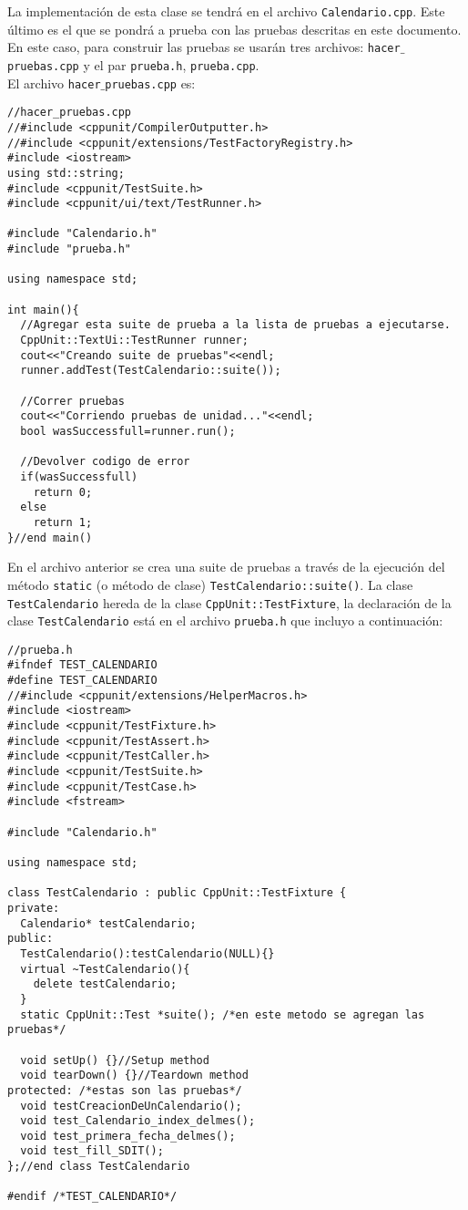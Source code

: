 \documentclass{article}
\begin{document}
La implementaci\'on de esta clase se tendr\'a en el archivo 
{\tt Calendario.cpp}. Este \'ultimo es el que se pondr\'a a 
prueba con las pruebas descritas en este documento. En este caso, 
para construir las pruebas se usar\'an tres archivos: 
{\tt hacer$\_$pruebas.cpp} y el par {\tt prueba.h}, {\tt prueba.cpp}.\\
El archivo {\tt hacer$\_$pruebas.cpp} es:
\begin{verbatim}
//hacer_pruebas.cpp
//#include <cppunit/CompilerOutputter.h>
//#include <cppunit/extensions/TestFactoryRegistry.h>
#include <iostream>
using std::string;
#include <cppunit/TestSuite.h>
#include <cppunit/ui/text/TestRunner.h>

#include "Calendario.h"
#include "prueba.h"

using namespace std;

int main(){
  //Agregar esta suite de prueba a la lista de pruebas a ejecutarse.
  CppUnit::TextUi::TestRunner runner;
  cout<<"Creando suite de pruebas"<<endl;
  runner.addTest(TestCalendario::suite());

  //Correr pruebas
  cout<<"Corriendo pruebas de unidad..."<<endl;
  bool wasSuccessfull=runner.run();

  //Devolver codigo de error
  if(wasSuccessfull)
    return 0;
  else
    return 1;
}//end main()
\end{verbatim}
En el archivo anterior se crea una suite de pruebas a trav\'es 
de la ejecuci\'on del m\'etodo {\tt static} (o m\'etodo de clase) 
{\tt TestCalendario::suite()}. La clase {\tt TestCalendario} 
hereda de la clase {\tt CppUnit::TestFixture}, la declaraci\'on 
de la clase {\tt TestCalendario} est\'a en el archivo 
{\tt prueba.h} que incluyo a continuaci\'on:
\begin{verbatim}
//prueba.h
#ifndef TEST_CALENDARIO
#define TEST_CALENDARIO
//#include <cppunit/extensions/HelperMacros.h>
#include <iostream>
#include <cppunit/TestFixture.h>
#include <cppunit/TestAssert.h>
#include <cppunit/TestCaller.h>
#include <cppunit/TestSuite.h>
#include <cppunit/TestCase.h>
#include <fstream>

#include "Calendario.h"

using namespace std;

class TestCalendario : public CppUnit::TestFixture {
private:
  Calendario* testCalendario;
public:
  TestCalendario():testCalendario(NULL){}
  virtual ~TestCalendario(){
    delete testCalendario;
  }
  static CppUnit::Test *suite(); /*en este metodo se agregan las pruebas*/
   
  void setUp() {}//Setup method
  void tearDown() {}//Teardown method
protected: /*estas son las pruebas*/
  void testCreacionDeUnCalendario();
  void test_Calendario_index_delmes();
  void test_primera_fecha_delmes();
  void test_fill_SDIT();
};//end class TestCalendario

#endif /*TEST_CALENDARIO*/
\end{verbatim}
\end{document}
